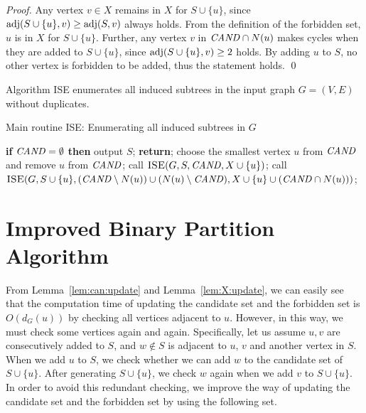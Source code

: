 \documentclass{llncs}
\newcommand{\set}[1]{\{#1\}}
\newcommand{\Can}{{\it CAND}}
\newcommand{\adj}{{\rm adj}}
\newcommand{\MyProc}[1]{{\rm \textsc{#1}}}
\begin{document}
\begin{proof}
    Any vertex $v \in X$ remains in $X$ for $S\cup\set{u}$, 
    since $\adj(S\cup\set{u}, v) \ge \adj(S, v)$ always holds. 
    From the definition of the forbidden set, 
    $u$ is in $X$ for $S\cup\set{u}$. 
    Further, 
    any vertex $v$ in $\Can \cap N(u)$ makes cycles when they are added to $S\cup\set{u}$, 
    since $\adj(S\cup\set{u}, v) \ge 2$ holds. 
By adding $u$ to $S$, 
    no other vertex is forbidden to be added, 
    thus the statement holds. 
    \qed
\end{proof}


\begin{theorem}
    \label{thm:correctness}
    Algorithm \MyProc{ISE} enumerates all induced subtrees 
    in the input graph $G = (V, E)$ without duplicates. 
\end{theorem}



\begin{algorithm}[t]
    \caption{Main routine \MyProc{ISE}: Enumerating all induced subtrees in $G$}
    \label{alg:ISE}
    \begin{algorithmic}[1]
        \Procedure{ISE}{$G = (V, E), S, \Can, X$}
        \State \textbf{if} $\Can = \emptyset$ 
               \textbf{then} output $S$; 
               \textbf{return};  
        \label{alg:ISE:output}
        \State choose the smallest vertex $u$ from $\Can$ and remove $u$ from $\Can$; 
        \label{alg:ISE:choose}
        \State call $\MyProc{ISE}(G, S, \Can, X\cup\set{u})$; 
        \label{alg:ISE:call1}
        \State call $\MyProc{ISE}(G, S\cup\set{u}, (\Can \setminus N(u)) \cup (N(u) \setminus \Can), X\cup\set{u}\cup(\Can \cap N(u)))$; 
        \label{alg:ISE:call2}
        \EndProcedure
    \end{algorithmic}
\end{algorithm}





\section{Improved Binary Partition Algorithm}
\label{sec:time:complexity} 

From Lemma~\ref{lem:can:update} and Lemma~\ref{lem:X:update}, 
we can easily see that 
the computation time of updating 
the candidate set and the forbidden set 
is $O(d_G(u))$ by checking all vertices adjacent to $u$. 
However, in this way, 
we must check some vertices again and again. 
Specifically, 
let us assume $u, v$ are consecutively added to $S$, 
and $w \notin S$ is adjacent to $u$, $v$ and another vertex in $S$. 
When we add $u$ to $S$, 
we check whether we can add $w$ to the candidate set of $S\cup\set{u}$. 
After generating $S\cup\set{u}$, we check $w$ again 
when we add $v$ to $S\cup\set{u}$. 
In order to avoid this redundant checking, 
we improve the way of updating the candidate set and the forbidden set 
by using the following set. 
\end{document}
